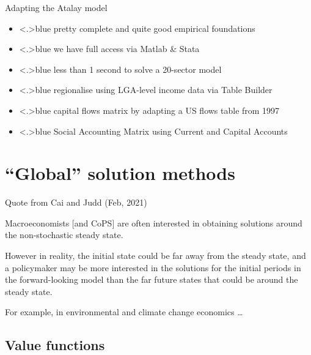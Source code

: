 \documentclass[handout,english]{beamer}
\begin{document}
\begin{frame}
{Adapting the Atalay model}
\begin{itemize}
  \item<+-|alert@+>{\color<.>{blue}
        pretty complete and quite good empirical foundations
        }
  \item<+-|alert@+>{\color<.>{blue}
        {\color{patrickcolor3} we have full access via Matlab \& Stata}
        }
\end{itemize}
\begin{itemize}
  \item<+-|alert@+>{\color<.>{blue}
        less than 1 second to solve a 20-sector model
        }

  \item<+-|alert@+>{\color<.>{blue}
        regionalise using LGA-level income data via Table Builder
        }
  \item<+-|alert@+>{\color<.>{blue}
        capital flows matrix by adapting a US flows table from 1997 \RKconfused\
        }
  \item<+-|alert@+>{\color<.>{blue}
        Social Accounting Matrix using Current and Capital Accounts}
\end{itemize}
  \end{frame}
\section{``Global'' solution methods}
\begin{frame}
  {\color{blue} Quote from Cai and Judd (Feb, 2021)}

  {\color{blue} Macroeconomists [and CoPS] are often interested in obtaining solutions around the non-stochastic steady state.}

  {\color{patrickcolor3} However in reality, the initial state could be far away from the steady state, and a policymaker may be more interested in the solutions for the initial periods in the forward-looking model than the far future states that could be around the steady state.}

  {\color{patrickcolor1} For example, in environmental and climate change economics \dots}
\end{frame}

\subsection{Value functions}
\end{document}
